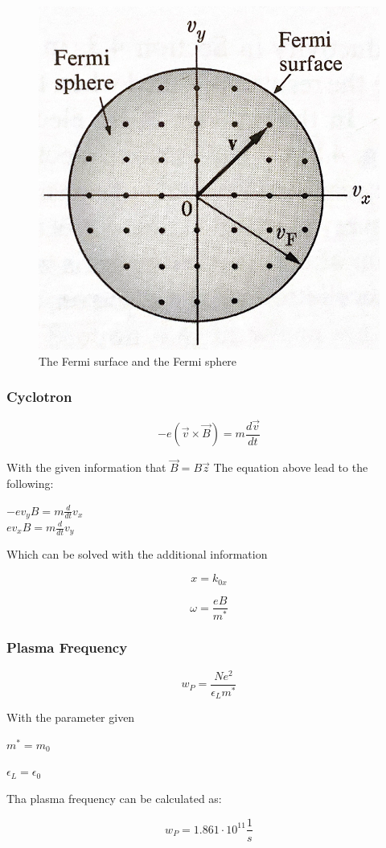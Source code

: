 \begin{figure}[H]
    \centering
    \includegraphics[width=0.4\linewidth]{Graphics/Chapter1/Fermi_Sphere.png}
    \caption{The Fermi surface and the Fermi sphere \cite[asdfadf]{elementary_SSP} }
    \label{}
\end{figure}

\subsubsection*{Cyclotron}
\begin{equation}
    -e (\vec{v} \times \vec{B}) =  m \frac{d\vec{v}}{dt}
\end{equation}

With the given information that $\vec{B} = B\vec{z}$
The equation above lead to the following:

$-e v_y B = m \frac{d}{dt}v_x$\\
$e v_x B = m \frac{d}{dt}v_y$

Which can be solved with the additional information

$$x = k_{0x}$$

$$\omega = \frac{eB}{m^*}$$

\subsubsection*{Plasma Frequency}

\begin{equation}
    w_P = \frac{Ne^2}{\epsilon_L m^*}
\end{equation}

With the parameter given

$m^*=m_0$

$\epsilon_L = \epsilon_0$

Tha plasma frequency can be calculated as:

$$w_P = 1.861 \cdot 10^{11} \frac{1}{s}$$